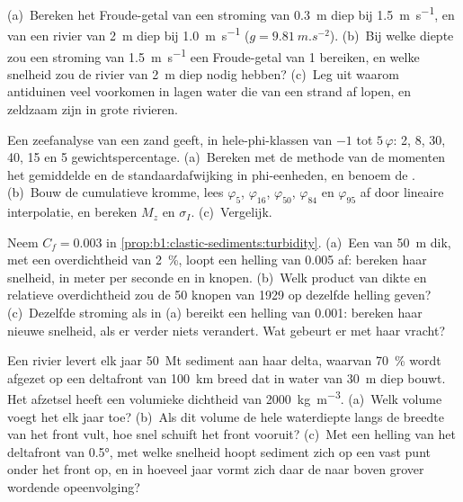 \begin{exercise}[$\star\star$]\label{exo:b1:clastic-sediments:9}
(a)~Bereken het Froude-getal van een stroming van \qty{0.3}{m} diep bij \qty{1.5}{m.s^{-1}}, en van een rivier van \qty{2}{m} diep bij \qty{1.0}{m.s^{-1}} ($g
= \qty{9.81}{m.s^{-2}}$). (b)~Bij welke diepte zou een stroming van \qty{1.5}{m.s^{-1}} een Froude-getal van 1 bereiken, en welke snelheid zou de rivier van \qty{2}{m} diep nodig hebben? (c)~Leg uit waarom antiduinen veel voorkomen in lagen water die van een strand af lopen, en zeldzaam zijn in grote rivieren.
\end{exercise}

\begin{exercise}[$\star\star\star$]\label{exo:b1:clastic-sediments:10}
Een zeefanalyse van een zand geeft, in hele-phi-klassen van $-1$ tot
$5\,\varphi$: 2, 8, 30, 40, 15 en 5 gewichtspercentage. (a)~Bereken met de methode van de momenten het gemiddelde en de standaardafwijking in phi-eenheden, en benoem de . (b)~Bouw de cumulatieve kromme, lees $\varphi_5$, $\varphi_{16}$, $\varphi_{50}$, $\varphi_{84}$ en $\varphi_{95}$ af door lineaire interpolatie, en bereken $M_z$ en $\sigma_I$. (c)~Vergelijk.
\end{exercise}

\begin{exercise}[$\star\star\star$]\label{exo:b1:clastic-sediments:11}
Neem $C_f = 0.003$ in \cref{prop:b1:clastic-sediments:turbidity}. (a)~Een  van \qty{50}{m} dik, met een overdichtheid van \qty{2}{\percent}, loopt een helling van \num{0.005} af: bereken haar snelheid, in meter per seconde en in knopen. (b)~Welk product van dikte en relatieve overdichtheid zou de 50 knopen van 1929 op dezelfde helling geven? (c)~Dezelfde stroming als in (a) bereikt een helling van \num{0.001}: bereken haar nieuwe snelheid, als er verder niets verandert. Wat gebeurt er met haar vracht?
\end{exercise}

\begin{exercise}[$\star\star\star$]\label{exo:b1:clastic-sediments:12}
Een rivier levert elk jaar \qty{50}{Mt} sediment aan haar delta, waarvan \qty{70}{\percent} wordt afgezet op een deltafront van \qty{100}{km} breed dat in water van \qty{30}{m} diep bouwt. Het afzetsel heeft een volumieke dichtheid van \qty{2000}{kg.m^{-3}}. (a)~Welk volume voegt het elk jaar toe? (b)~Als dit volume de hele waterdiepte langs de breedte van het front vult, hoe snel schuift het front vooruit? (c)~Met een helling van het deltafront van \ang{0.5}, met welke snelheid hoopt sediment zich op een vast punt onder het front op, en in hoeveel jaar vormt zich daar de naar boven grover wordende opeenvolging?
\end{exercise}

